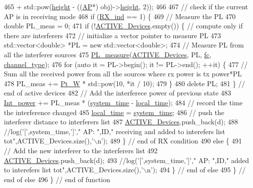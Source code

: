 \begin{DoxyCode}
465                             + std::pow(\hyperlink{classAP_a27fec97f7b61e45d1350555cf62535d4}{height} - ((\hyperlink{classAP}{AP}*) obj)->\hyperlink{classAP_a27fec97f7b61e45d1350555cf62535d4}{height}, 2));
466 
467         \textcolor{comment}{// check if the current AP is in receiving mode}
468         \textcolor{keywordflow}{if} (\hyperlink{classAP_af5b1c2bc10a9ce9f3007bbf37f95f144}{RX\_ind} == 1) \{
469             \textcolor{comment}{// Measure the PL}
470             \textcolor{keywordtype}{double} PL\_meas = 0;
471             \textcolor{keywordflow}{if} (!\hyperlink{classAP_ab6dd8d2144b1be8dea239c3d76fc60cd}{ACTIVE\_Devices}.empty()) \{ \textcolor{comment}{// compute only if there are interferers}
472                 \textcolor{comment}{// initialize a vector pointer to measure PL}
473                 std::vector<double> *PL = \textcolor{keyword}{new} std::vector<double>;
474                 \textcolor{comment}{// Measure PL from all the interferer sources}
475                 \hyperlink{PL__measure_8cpp_afb433c5f099becf495d3c9d29ffc707d}{PL\_measure}(\hyperlink{classAP_ab6dd8d2144b1be8dea239c3d76fc60cd}{ACTIVE\_Devices}, PL, \hyperlink{classAP_af7f928faaa72cbfe5c4f905cb146a564}{fc}, 
      \hyperlink{classAP_a334f5b7be9725824797db57032de80e2}{channel\_type});
476                 \textcolor{keywordflow}{for} (\textcolor{keyword}{auto} it = PL->begin(); it != PL->end(); ++it) \{
477                     \textcolor{comment}{// Sum all the received power from all the sources where rx power is tx power*PL}
478                     PL\_meas += \hyperlink{classAP_a10998008dbe6e924211af8d9ee155534}{Pt\_W} * std::pow(10, *it / 10);
479                 \}
480                 \textcolor{keyword}{delete} PL;
481             \} \textcolor{comment}{// end of active devices}
482               \textcolor{comment}{// Add the interferece power of previous state}
483             \hyperlink{classAP_a6c2c3e61c88d4bba7d949f5663b3ea10}{Int\_power} += PL\_meas * (\hyperlink{AP_8cpp_aaa03a568dc1d9d3391286ea24b9cfb63}{system\_time} - \hyperlink{classAP_ab31a52cd05ca5daf9ccd5d24941fe395}{local\_time});
484             \textcolor{comment}{// record the time the interference changed}
485             \hyperlink{classAP_ab31a52cd05ca5daf9ccd5d24941fe395}{local\_time} = \hyperlink{AP_8cpp_aaa03a568dc1d9d3391286ea24b9cfb63}{system\_time};
486             \textcolor{comment}{// push the interferer distance to interferers list}
487             \hyperlink{classAP_ab6dd8d2144b1be8dea239c3d76fc60cd}{ACTIVE\_Devices}.push\_back(d);
488             \textcolor{comment}{//log('[',system\_time,']'," AP: ",ID," receiving and added to interefers list
       tot",ACTIVE\_Devices.size(),'\(\backslash\)n');}
489         \} \textcolor{comment}{// end of RX condition}
490         \textcolor{keywordflow}{else} \{
491             \textcolor{comment}{// Add the new interferer to the interferers list}
492             \hyperlink{classAP_ab6dd8d2144b1be8dea239c3d76fc60cd}{ACTIVE\_Devices}.push\_back(d);
493             \textcolor{comment}{//log('[',system\_time,']'," AP: ",ID," added to interefers list
       tot",ACTIVE\_Devices.size(),'\(\backslash\)n');}
494         \} \textcolor{comment}{// end of else}
495     \} \textcolor{comment}{// end of else}
496 \} \textcolor{comment}{// end of function}
\end{DoxyCode}

